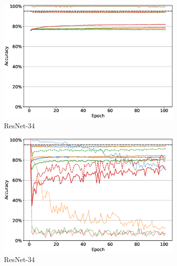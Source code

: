 \begin{figure}
\begin{subfigure}[b]{0.49\textwidth}
         \includegraphics[width=\textwidth]{images/finetuning/finetuning_protecting_content_smalllr_thesis_resnet34.eps}
         \caption{ResNet-34}
         \label{fig:finetuning_resnet34_smalllr}
     \end{subfigure}
     \hfill
     \begin{subfigure}[b]{0.49\textwidth}
         \centering
         \includegraphics[width=\textwidth]{images/finetuning/finetuning_protecting_content_largelr_thesis_resnet34.eps}
         \caption{ResNet-34}
         \label{fig:finetuning_resnet34_largelr}
     \end{subfigure}
     \hfill
     \begin{subfigure}[b]{0.49\textwidth}
         \centering

\end{subfigure}
\end{figure}
